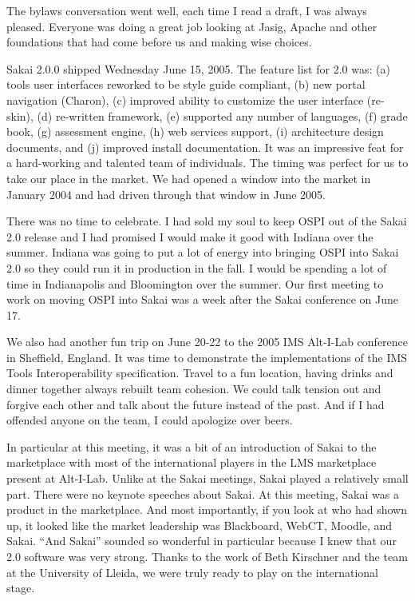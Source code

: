 \documentclass[12pt]{book}
\begin{document}
The bylaws conversation went well, each time I read
a draft, I was always pleased.   Everyone was doing a great
job looking at Jasig, Apache and other foundations that had
come before us and making wise choices.

Sakai 2.0.0 shipped Wednesday June 15, 2005.  The feature list
for 2.0 was:
(a) tools user interfaces reworked to be style guide compliant,
(b) new portal navigation (Charon),
(c) improved ability to customize the user interface (re-skin),
(d) re-written framework,
(e) supported any number of languages,
(f) grade book,
(g) assessment engine,
(h) web services support,
(i) architecture design documents, and
(j) improved install documentation.
It was an impressive feat for a hard-working and talented
team of individuals.  The timing was perfect for us to take
our place in the market.  We had opened a window into the market
in January 2004 and had driven through that window in June 2005.

There was no time to celebrate. I had sold my soul to keep
OSPI out of the Sakai 2.0 release and I had promised I would
make it good with Indiana over the summer.  Indiana was going
to put a lot of energy into bringing OSPI into Sakai 2.0 so
they could run it in production in the fall. I would be spending
a lot of time in Indianapolis and Bloomington over the summer.
Our first meeting to work on moving OSPI into Sakai was a
week after the Sakai conference on June 17.

We also had another fun trip on June 20-22 to the 2005 IMS
Alt-I-Lab conference in Sheffield, England.  It was time to
demonstrate the implementations of the IMS Tools Interoperability
specification.  Travel to a fun location, having drinks and
dinner together always rebuilt team cohesion.  We could talk
tension out and forgive each other and talk about the future
instead of the past. And if I had offended anyone on the team,
I could apologize over beers.

In particular at this meeting, it was a bit of an
introduction of Sakai to the marketplace with most
of the international players in the LMS marketplace present
at Alt-I-Lab.  Unlike at the Sakai meetings, Sakai played
a relatively small part.   There were no keynote speeches about
Sakai.  At this meeting, Sakai was a product in the marketplace.  And most
importantly, if you look at who had shown up, it looked like
the market leadership was Blackboard, WebCT, Moodle, and
Sakai.  ``And Sakai'' sounded so wonderful in particular because
I knew that our 2.0 software was very strong.  Thanks to the
work of Beth Kirschner and the team at the University of Lleida,
we were truly ready to play on the international stage.
\end{document}
